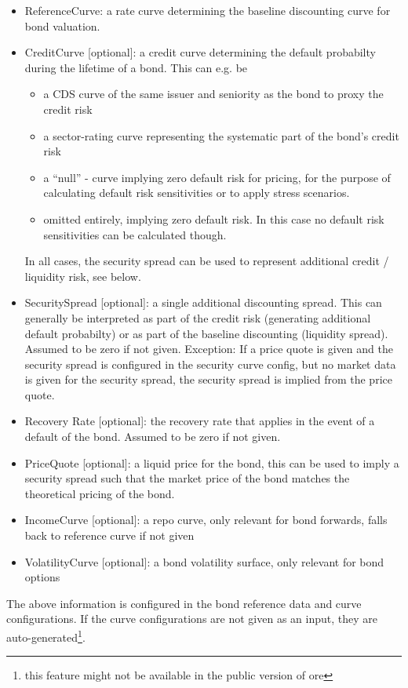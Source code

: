 \documentclass[12pt, a4paper]{article}
\begin{document}
\begin{itemize}
\item ReferenceCurve: a rate curve determining the baseline discounting curve for bond valuation.
\item CreditCurve [optional]: a credit curve determining the default probabilty during the lifetime of a bond. This can
  e.g. be
\begin{itemize}
\item a CDS curve of the same issuer and seniority as the bond to proxy the credit risk
\item a sector-rating curve representing the systematic part of the bond's credit risk
\item a ``null'' - curve implying zero default risk for pricing, for the purpose of calculating default risk
  sensitivities or to apply stress scenarios.
\item omitted entirely, implying zero default risk. In this case no default risk sensitivities can be calculated though.
\end{itemize}
In all cases, the security spread can be used to represent additional credit / liquidity risk, see below.
\item SecuritySpread [optional]: a single additional discounting spread. This can generally be interpreted as part of
  the credit risk (generating additional default probabilty) or as part of the baseline discounting (liquidity
  spread). Assumed to be zero if not given. Exception: If a price quote is given and the security spread is configured
  in the security curve config, but no market data is given for the security spread, the security spread is implied from
  the price quote.
\item Recovery Rate [optional]: the recovery rate that applies in the event of a default of the bond. Assumed to be zero
  if not given.
\item PriceQuote [optional]: a liquid price for the bond, this can be used to imply a security spread such that the
  market price of the bond matches the theoretical pricing of the bond.
\item IncomeCurve [optional]: a repo curve, only relevant for bond forwards, falls back to reference curve if not given
\item VolatilityCurve [optional]: a bond volatility surface, only relevant for bond options
\end{itemize}

The above information is configured in the bond reference data and curve configurations. If the curve configurations are
not given as an input, they are auto-generated\footnote{this feature might not be available in the public version of
ore}.
\end{document}
